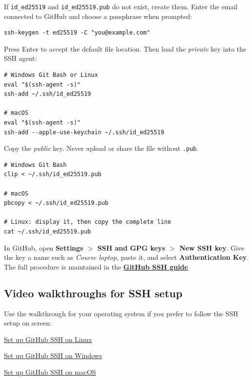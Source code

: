 If \texttt{id\_ed25519} and \texttt{id\_ed25519.pub} do not exist, create them.
Enter the email connected to GitHub and choose a passphrase when prompted:

\begin{lstlisting}[style=mlterminal]
ssh-keygen -t ed25519 -C "you@example.com"
\end{lstlisting}

Press Enter to accept the default file location. Then load the \emph{private}
key into the SSH agent:

\begin{lstlisting}[style=mlterminal]
# Windows Git Bash or Linux
eval "$(ssh-agent -s)"
ssh-add ~/.ssh/id_ed25519

# macOS
eval "$(ssh-agent -s)"
ssh-add --apple-use-keychain ~/.ssh/id_ed25519
\end{lstlisting}

Copy the \emph{public} key. Never upload or share the file without
\texttt{.pub}.

\begin{lstlisting}[style=mlterminal]
# Windows Git Bash
clip < ~/.ssh/id_ed25519.pub

# macOS
pbcopy < ~/.ssh/id_ed25519.pub

# Linux: display it, then copy the complete line
cat ~/.ssh/id_ed25519.pub
\end{lstlisting}

In GitHub, open \textbf{Settings $>$ SSH and GPG keys $>$ New SSH key}. Give the
key a name such as \emph{Course laptop}, paste it, and select
\textbf{Authentication Key}. The full procedure is maintained in the
\href{https://docs.github.com/en/authentication/connecting-to-github-with-ssh}{\textbf{GitHub SSH guide}}

\subsection{Video walkthroughs for SSH setup}

Use the walkthrough for your operating system if you prefer to follow the SSH
setup on screen:

\begin{tcolorbox}[
  enhanced,
  breakable,
  colback=UTPPaleOrange,
  colframe=UTPOrange,
  colbacktitle=UTPOrange,
  boxrule=1pt,
  arc=2mm,
  title={Choose your operating system},
  fonttitle=\bfseries\color{white},
  left=3mm,right=3mm,top=2mm,bottom=2mm
]
\begin{description}[leftmargin=1.15in,style=nextline]
  \item[Linux]
    \href{https://youtu.be/AOM8CEyu3Ug?t=121}{Set up GitHub SSH on Linux}
  \item[Windows]
    \href{https://youtu.be/YT5YimhyX18?t=5}{Set up GitHub SSH on Windows}
  \item[macOS]
    \href{https://youtu.be/ACvE5Uy7ZB0?t=437}{Set up GitHub SSH on macOS}
\end{description}
\end{tcolorbox}


